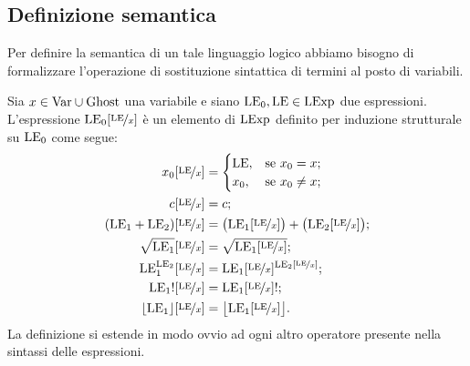 \subsection{Definizione semantica}
Per definire la semantica di un tale linguaggio logico abbiamo bisogno
di formalizzare l'operazione di sostituzione sintattica di termini
al posto di variabili.

\begin{definizione} 
Sia $x \in \mathrm{Var} \cup \mathrm{Ghost}$ una variabile e siano $\mathrm{LE}_0, \mathrm{LE} \in \mathrm{LExp}$
due espressioni.
L'espressione $\mathrm{LE}_0[\nicefrac{\mathrm{LE}}{x}]$ è un elemento di $\mathrm{LExp}$ definito
per induzione strutturale su $\mathrm{LE}_0$ come segue:
\begin{align*}
   x_0[\nicefrac{\mathrm{LE}}{x}]
    &=
      \begin{cases}
        \mathrm{LE}, &\text{se $x_0 = x$;} \\
        x_0, &\text{se $x_0 \neq x$;}
      \end{cases} \\
   c[\nicefrac{\mathrm{LE}}{x}]
    &= c;\\
  (\mathrm{LE}_1 + \mathrm{LE}_2)[\nicefrac{\mathrm{LE}}{x}]
     &= \bigl(\mathrm{LE}_1[\nicefrac{\mathrm{LE}}{x}]\bigr) + \bigl(\mathrm{LE}_2[\nicefrac{\mathrm{LE}}{x}]\bigr);\\
  \sqrt{\mathrm{LE}_1}[\nicefrac{\mathrm{LE}}{x}]
     &= \sqrt{{\mathrm{LE}_1}[\nicefrac{\mathrm{LE}}{x}]};\\
  \mathrm{LE}_1^{\mathrm{LE}_2}[\nicefrac{\mathrm{LE}}{x}]
     &= \mathrm{LE}_1[\nicefrac{\mathrm{LE}}{x}]^{\mathrm{LE}_2[\nicefrac{\mathrm{LE}}{x}]};\\
  {\mathrm{LE}_1}![\nicefrac{\mathrm{LE}}{x}]
     &= {{\mathrm{LE}_1}[\nicefrac{\mathrm{LE}}{x}]}!;\\
  \lfloor \mathrm{LE}_1 \rfloor[\nicefrac{\mathrm{LE}}{x}]
     &= \bigl\lfloor \mathrm{LE}_1[\nicefrac{\mathrm{LE}}{x}] \bigr\rfloor.\\
\end{align*}
La definizione si estende in modo ovvio ad ogni altro operatore presente
nella sintassi delle espressioni.
\end{definizione}

